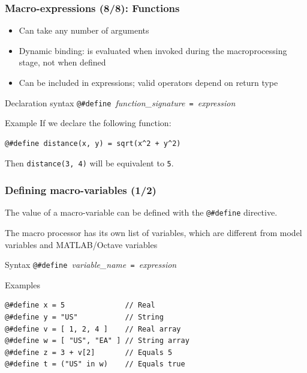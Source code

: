 \documentclass[aspectratio=169]{beamer}
\begin{document}
\begin{frame}[fragile=singleslide]
  \frametitle{Macro-expressions (8/8): Functions}
  \begin{itemize}
  \item Can take any number of arguments
  \item Dynamic binding: is evaluated when invoked during the macroprocessing stage, not when defined
  \item Can be included in expressions; valid operators depend on return type
  \end{itemize}

  \begin{block}{Declaration syntax}
    \verb+@#define +\textit{function\_signature}\verb+ = +\textit{expression}
  \end{block}

  \begin{block}{Example}
If we declare the following function:
\begin{verbatim}
@#define distance(x, y) = sqrt(x^2 + y^2)
\end{verbatim}
Then \texttt{distance(3, 4)} will be equivalent to \texttt{5}.
  \end{block}
\end{frame}

\begin{frame}[fragile=singleslide]
  \frametitle{Defining macro-variables (1/2)}

  The value of a macro-variable can be defined with the \verb+@#define+
  directive.

  The macro processor has its own list of variables, which are different from model variables and MATLAB/Octave variables

  \begin{block}{Syntax}
    \verb+@#define +\textit{variable\_name}\verb+ = +\textit{expression}
  \end{block}

  \begin{block}{Examples}
\begin{verbatim}
@#define x = 5              // Real
@#define y = "US"           // String
@#define v = [ 1, 2, 4 ]    // Real array
@#define w = [ "US", "EA" ] // String array
@#define z = 3 + v[2]       // Equals 5
@#define t = ("US" in w)    // Equals true
\end{verbatim}
  \end{block}
\end{frame}
\end{document}
